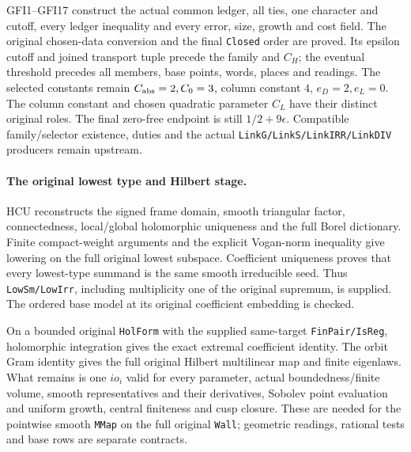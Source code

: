 GFI1--GFI17 construct the actual common ledger, all ties, one character
and cutoff, every ledger inequality and every error, size, growth and
cost field. The original chosen-data conversion and the final
\texttt{Closed} order are proved. Its epsilon cutoff and joined
transport tuple precede the family and $C_H$; the eventual threshold
precedes all members, base points, words, places and readings.
The selected constants remain $C_{\rm abs}=2,C_0=3$, column constant
$4$, $e_D=2,e_L=0$. The column constant and chosen quadratic parameter
$C_L$ have their distinct original roles. The final zero-free endpoint
is still $1/2+9\epsilon$.
Compatible family/selector existence, duties and the actual
\texttt{LinkG/LinkS/LinkIRR/LinkDIV} producers remain upstream.

\paragraph{The original lowest type and Hilbert stage.}
HCU reconstructs the signed frame domain, smooth triangular factor,
connectedness, local/global holomorphic uniqueness and the full Borel
dictionary. Finite compact-weight arguments and the explicit Vogan-norm
inequality give lowering on the full original lowest subspace.
Coefficient uniqueness proves that every lowest-type summand is the
same smooth irreducible seed. Thus \texttt{LowSm/LowIrr}, including
multiplicity one of the original supremum, is supplied. The ordered
base model at its original coefficient embedding is checked.

On a bounded original \texttt{HolForm} with the supplied same-target
\texttt{FinPair/IsReg}, holomorphic integration gives the exact extremal
coefficient identity. The orbit Gram identity gives the full original
Hilbert multilinear map and finite eigenlaws. What remains is one
$io_i$ valid for every parameter, actual boundedness/finite volume,
smooth representatives and their derivatives, Sobolev point evaluation
and uniform growth, central finiteness and cusp closure. These are
needed for the pointwise smooth \texttt{MMap} on the full original
\texttt{Wall}; geometric readings, rational tests and base rows are
separate contracts.

